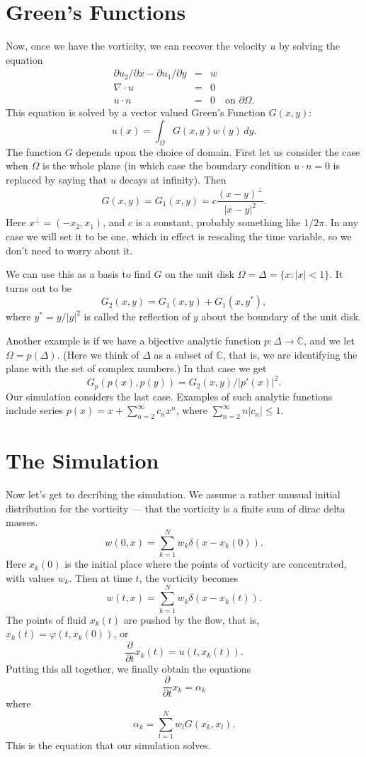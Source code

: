 \documentclass[12pt]{article}
\begin{document}
\section{Green's Functions}

Now, once we have the vorticity, we can recover the velocity $u$ by
solving the equation
\begin{eqnarray*}
\partial u_2/\partial x - \partial u_1/\partial y &=& w \\
\nabla \cdot u &=& 0 \\
u \cdot n &=& 0 \quad \text{on $\partial \Omega$}.
\end{eqnarray*}
This equation is solved by a vector valued Green's Function $G(x,y)$:
$$ u(x) = \int_\Omega G(x,y) w(y) \, dy .$$
The function $G$ depends upon the choice of domain.  First let us consider
the case when $\Omega$ is the whole plane (in which case the boundary
condition $u \cdot n = 0$ is replaced by saying that $u$ decays at infinity).
Then
\begin{equation*}
G(x,y) = G_1(x,y) = c \frac{(x-y)^\perp}{|x-y|^2} .
\end{equation*}
Here $x^\perp = (-x_2,x_1)$, and $c$ is a constant, probably something
like $1/2\pi$.  In any case we will set it to be one, which in effect
is rescaling the time variable, so we don't need to worry about it.

We can use this as a basis to find $G$ on the unit disk
$\Omega = \Delta = \{x:|x|<1\}$.  It turns out to be
\begin{equation*}
G_2(x,y) = G_1(x,y) + G_1(x,y^*) ,
\end{equation*}
where $y^* = y/|y|^2$ is called the reflection of $y$ about the
boundary of the unit disk.

Another example is if we have a bijective analytic function
$p:\Delta \to {\mathbb C}$, and we let $\Omega = p(\Delta)$.
(Here we think of $\Delta$ as a subset of $\mathbb C$, that is,
we are identifying the plane with the set of complex numbers.)
In that case we get
\[ G_p(p(x),p(y)) = G_2(x,y)/|p'(x)|^2 .\]
Our simulation considers the last case.  Examples of such
analytic functions include series 
$p(x) = x + \sum_{n=2}^\infty c_n x^n$, where
$\sum_{n=2}^\infty n |c_n| \le 1$.

\section{The Simulation}

Now let's get to decribing the simulation.  We assume a rather
unusual initial distribution for the vorticity --- that the
vorticity is a finite sum of dirac delta masses.
\[ w(0,x) = \sum_{k=1}^N w_k \delta(x-x_k(0)) .\]
Here $x_k(0)$ is the initial place where the points
of vorticity are concentrated, with values $w_k$.  
Then at time $t$, the vorticity becomes
\[ w(t,x) = \sum_{k=1}^N w_k \delta(x-x_k(t)) .\]
The points of fluid $x_k(t)$ are pushed by the
flow, that is, $x_k(t) = \varphi(t,x_k(0))$, or
\[ \frac{\partial}{\partial t} x_k(t) = u(t,x_k(t)) .\]
Putting this all together, we finally obtain the equations
\[ \frac{\partial}{\partial t} x_k = \alpha_k \]
where
\[ \alpha_k   = \sum_{l=1}^N w_l G(x_k,x_l) .\]
This is the equation that our simulation solves.
\end{document}
